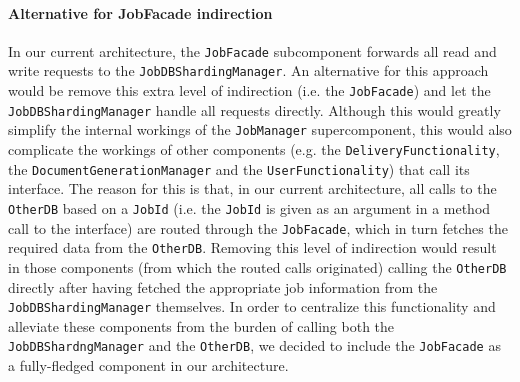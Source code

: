 \documentclass[a4paper,10pt]{article}
\begin{document}
\paragraph{Alternative for JobFacade indirection}
In our current architecture, the \texttt{JobFacade} subcomponent forwards all read and write requests to the \texttt{JobDBShardingManager}. An alternative for this approach would be remove this extra level of indirection (i.e. the \texttt{JobFacade}) and let the \texttt{JobDBShardingManager} handle all requests directly. Although this would greatly simplify the internal workings of the \texttt{JobManager} supercomponent, this would also complicate the workings of other components (e.g. the \texttt{DeliveryFunctionality}, the \texttt{DocumentGenerationManager} and the \texttt{UserFunctionality}) that call its interface. The reason for this is that, in our current architecture, all calls to the \texttt{OtherDB} based on a \texttt{JobId} (i.e. the \texttt{JobId} is given as an argument in a method call to the interface) are routed through the \texttt{JobFacade}, which in turn fetches the required data from the \texttt{OtherDB}. Removing this level of indirection would result in those components (from which the routed calls originated) calling the \texttt{OtherDB} directly after having fetched the appropriate job information from the \texttt{JobDBShardingManager} themselves. In order to centralize this functionality and alleviate these components from the burden of calling both the \texttt{JobDBShardngManager} and the \texttt{OtherDB}, we decided to include the \texttt{JobFacade} as a fully-fledged component in our architecture.
\end{document}
